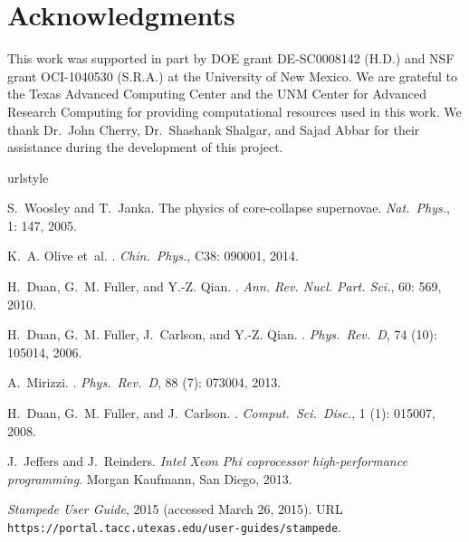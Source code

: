 \documentclass{sig-alternate}
\begin{document}
\section*{Acknowledgments}
This work was supported in part by DOE grant DE-SC0008142 (H.D.) and
NSF grant OCI-1040530 (S.R.A.) at the University of New Mexico. We are
grateful to the Texas Advanced
Computing Center and the UNM Center for
Advanced Research Computing for providing computational resources used
in this work. We thank Dr.\ John Cherry,
Dr.\ Shashank Shalgar, and
Sajad Abbar for their assistance during the development of this
project. 




\begin{thebibliography}{8}
\providecommand{\natexlab}[1]{#1}
\providecommand{\url}[1]{\texttt{#1}}
\expandafter\ifx\csname urlstyle\endcsname\relax
  \providecommand{\doi}[1]{doi: #1}\else
  \providecommand{\doi}{doi: \begingroup \urlstyle{rm}\Url}\fi

S.~Woosley and T.~Janka.
\newblock The physics of core-collapse supernovae.
\newblock \emph{Nat.~Phys.}, 1: 147, 2005.

K.~A. Olive et~al.
.
\newblock \emph{Chin.~Phys.}, C38: 090001, 2014.

H.~Duan, G.~M. Fuller, and Y.-Z. Qian.
.
\newblock \emph{Ann. Rev. Nucl. Part. Sci.}, 60: 569, 2010.

H.~Duan, G.~M. Fuller, J.~Carlson, and Y.-Z. Qian.
.
\newblock \emph{Phys.~Rev.~D}, 74 (10): 105014, 2006.

A.~Mirizzi.
.
\newblock \emph{Phys.~Rev.~D}, 88 (7): 073004, 2013.

H.~Duan, G.~M. Fuller, and J.~Carlson.
.
\newblock \emph{Comput.~Sci.~Disc.}, 1 (1): 015007, 2008.

J.~Jeffers and J.~Reinders.
\newblock \emph{{Intel Xeon Phi coprocessor high-performance programming}}.
\newblock Morgan Kaufmann, San Diego, 2013.

\emph{{Stampede User Guide}}, 2015 (accessed March 26, 2015).
\newblock URL \url{https://portal.tacc.utexas.edu/user-guides/stampede}.

\end{thebibliography}
\end{document}
